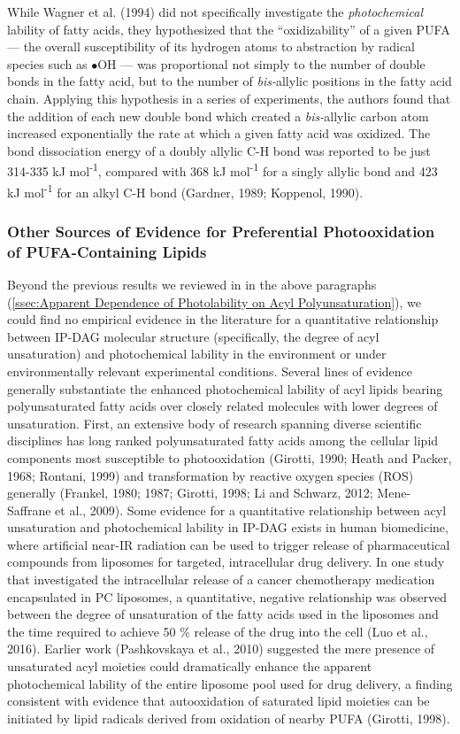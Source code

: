 While Wagner et al. (1994) did not specifically investigate the \emph{photochemical} lability of fatty acids, they hypothesized that the ``oxidizability'' of a given PUFA --- the overall susceptibility of its hydrogen atoms to abstraction by radical species such as $\bullet$OH --- was proportional not simply to the number of double bonds in the fatty acid, but to the number of \emph{bis-}allylic positions in the fatty acid chain. Applying this hypothesis in a series of experiments, the authors found that the addition of each new double bond which created a \emph{bis-}allylic carbon atom increased exponentially the rate at which a given fatty acid was oxidized. The bond dissociation energy of a doubly allylic C-H bond was reported to be just 314-335 kJ mol\textsuperscript{-1}, compared with 368 kJ mol\textsuperscript{-1} for a singly allylic bond and 423 kJ mol\textsuperscript{-1} for an alkyl C-H bond (Gardner, 1989; Koppenol, 1990).

\subsubsection{Other Sources of Evidence for Preferential Photooxidation of PUFA-Containing Lipids}

Beyond the previous results we reviewed in in the above paragraphs (\autoref{ssec:Apparent Dependence of Photolability on Acyl Polyunsaturation}), we could find no empirical evidence in the literature for a quantitative relationship between IP-DAG molecular structure (specifically, the degree of acyl unsaturation) and photochemical lability in the environment or under environmentally relevant experimental conditions. Several lines of evidence generally substantiate the enhanced photochemical lability of acyl lipids bearing polyunsaturated fatty acids over closely related molecules with lower degrees of unsaturation. First, an extensive body of research spanning diverse scientific disciplines has long ranked polyunsaturated fatty acids among the cellular lipid components most susceptible to photooxidation (Girotti, 1990; Heath and Packer, 1968; Rontani, 1999) and transformation by reactive oxygen species (ROS) generally (Frankel, 1980; 1987; Girotti, 1998; Li and Schwarz, 2012; Mene-Saffrane et al., 2009). Some evidence for a quantitative relationship between acyl unsaturation and photochemical lability in IP-DAG exists in human biomedicine, where artificial near-IR radiation can be used to trigger release of pharmaceutical compounds from liposomes for targeted, intracellular drug delivery. In one study that investigated the intracellular release of a cancer chemotherapy medication encapsulated in PC liposomes, a quantitative, negative relationship was observed between the degree of unsaturation of the fatty acids used in the liposomes and the time required to achieve 50 \% release of the drug into the cell (Luo et al., 2016). Earlier work (Pashkovskaya et al., 2010) suggested the mere presence of unsaturated acyl moieties could dramatically enhance the apparent photochemical lability of the entire liposome pool used for drug delivery, a finding consistent with evidence that autooxidation of saturated lipid moieties can be initiated by lipid radicals derived from oxidation of nearby PUFA (Girotti, 1998).

